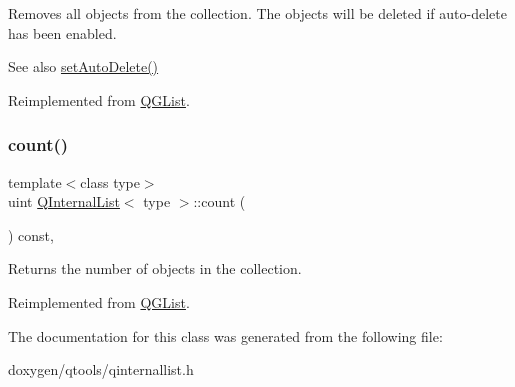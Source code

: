 Removes all objects from the collection. The objects will be deleted if auto-\/delete has been enabled. \begin{DoxySeeAlso}{See also}
\mbox{\hyperlink{class_q_collection_a6ed41913c76bfba54be6da26015ee3f3}{set\+Auto\+Delete()}} 
\end{DoxySeeAlso}


Reimplemented from \mbox{\hyperlink{class_q_g_list_a9b89540497bfcf674466dcf9e343d981}{Q\+G\+List}}.

\mbox{\label{class_q_internal_list_af64a4279703a3aeb1954937cdf2fa1f2}} 
\subsubsection{\texorpdfstring{count()}{count()}}
{\footnotesize\ttfamily template$<$class type$>$ \\
uint \mbox{\hyperlink{class_q_internal_list}{Q\+Internal\+List}}$<$ type $>$\+::count (\begin{DoxyParamCaption}{ }\end{DoxyParamCaption}) const\hspace{0.3cm}{\ttfamily [inline]}, {\ttfamily [virtual]}}

Returns the number of objects in the collection. 

Reimplemented from \mbox{\hyperlink{class_q_g_list_af765260057e85e575adff7fd9f25d062}{Q\+G\+List}}.



The documentation for this class was generated from the following file\+:\begin{DoxyCompactItemize}
\item 
doxygen/qtools/qinternallist.\+h\end{DoxyCompactItemize}
